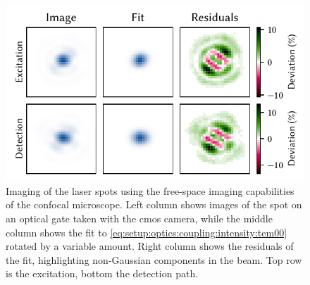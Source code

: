 \begin{figure}
    \centering
    \includegraphics{img/pdf/setup/spots}
    \caption[]{
        Imaging of the laser spots using the free-space imaging capabilities of the confocal microscope.
        Left column shows images of the spot on an optical gate taken with the \gls{cmos} camera, while the middle column shows the fit to \cref{eq:setup:optics:coupling:intensity:tem00} rotated by a variable amount.
        Right column shows the residuals of the fit, highlighting non-Gaussian components in the beam.
        Top row is the excitation, bottom the detection path.
    }
    \label{fig:setup:optics:coupling:imaging}
\end{figure}

